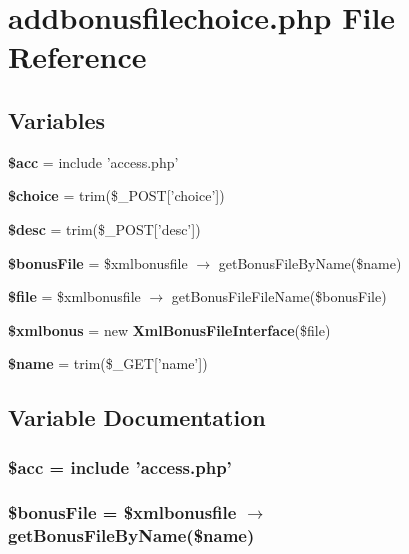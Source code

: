 \section{addbonusfilechoice.php File Reference}
\label{addbonusfilechoice_8php}


\subsection*{Variables}
\begin{CompactItemize}
\item 
{\bf \$acc} = include 'access.php'
\item 
{\bf \$choice} = trim(\$\_\-POST['choice'])
\item 
{\bf \$desc} = trim(\$\_\-POST['desc'])
\item 
{\bf \$bonus\-File} = \$xmlbonusfile $\rightarrow$ get\-Bonus\-File\-By\-Name(\$name)
\item 
{\bf \$file} = \$xmlbonusfile $\rightarrow$ get\-Bonus\-File\-File\-Name(\$bonus\-File)
\item 
{\bf \$xmlbonus} = new {\bf Xml\-Bonus\-File\-Interface}(\$file)
\item 
{\bf \$name} = trim(\$\_\-GET['name'])
\end{CompactItemize}


\subsection{Variable Documentation}
\subsubsection{\setlength{\rightskip}{0pt plus 5cm}\$acc = include 'access.php'}\label{addbonusfilechoice_8php_542926c588a05eb69553d79c83cf73da}


\subsubsection{\setlength{\rightskip}{0pt plus 5cm}\$bonus\-File = \$xmlbonusfile $\rightarrow$ get\-Bonus\-File\-By\-Name(\$name)}\label{addbonusfilechoice_8php_6031931b24e474b9c8829866a2fdc6f6}


